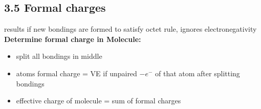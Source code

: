 \subsection{3.5 Formal charges}
    results if new bondings are formed to satisfy octet rule, ignores electronegativity\\
    \textbf{Determine formal charge in Molecule:}
    \begin{itemize}
        \itemsep0em
        \item split all bondings in middle
        \item atoms formal charge = VE if unpaired $- e^-$ of that atom after splitting bondings
        \item effective charge of molecule = sum of formal charges
    \end{itemize}
